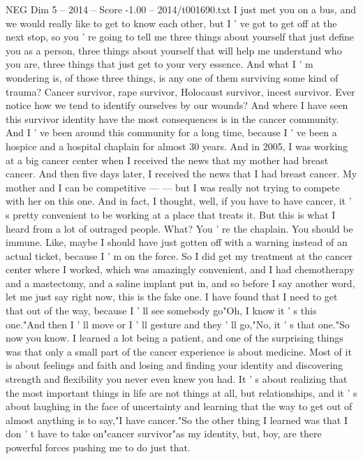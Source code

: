 \begin{textsample}{NEG Dim 5 – 2014 – Score -1.00 – 2014/t001690.txt}  \label{ex:f5_neg_037}
I just met you on a bus, and we would really like to get to know each other, but I ' ve got to get off at the next stop, so you ' re going to tell me three things about yourself that just define you as a person, three things about yourself that will help me understand who you are, three things that just get to your very essence.
And what I ' m wondering is, of those three things, is any one of them surviving some kind of trauma?
Cancer survivor, rape survivor, Holocaust survivor, incest survivor.
Ever notice how we tend to identify ourselves by our wounds?
And where I have seen this survivor identity have the most consequences is in the cancer community.
And I ' ve been around this community for a long time, because I ' ve been a hospice and a hospital chaplain for almost 30 years.
And in 2005, I was working at a big cancer center when I received the news that my mother had breast cancer.
And then five days later, I received the news that I had breast cancer.
My mother and I can be competitive — — but I was really not trying to compete with her on this one.
And in fact, I thought, well, if you have to have cancer, it ' s pretty convenient to be working at a place that treats it.
But this is what I heard from a lot of outraged people.
What?
You ' re the chaplain.
You should be immune.
Like, maybe I should have just gotten off with a warning instead of an actual ticket, because I ' m on the force.
So I did get my treatment at the cancer center where I worked, which was amazingly convenient, and I had chemotherapy and a mastectomy, and a saline implant put in, and so before I say another word, let me just say right now, this is the fake one.
I have found that I need to get that out of the way, because I ' ll see somebody go"Oh, I know it ' s this one."And then I ' ll move or I ' ll gesture and they ' ll go,"No, it ' s that one."So now you know.
I learned a lot being a patient, and one of the surprising things was that only a small part of the cancer experience is about medicine.
Most of it is about feelings and faith and losing and finding your identity and discovering strength and flexibility you never even knew you had.
It ' s about realizing that the most important things in life are not things at all, but relationships, and it ' s about laughing in the face of uncertainty and learning that the way to get out of almost anything is to say,"I have cancer."So the other thing I learned was that I don ' t have to take on"cancer survivor"as my identity, but, boy, are there powerful forces pushing me to do just that.

\end{textsample}
